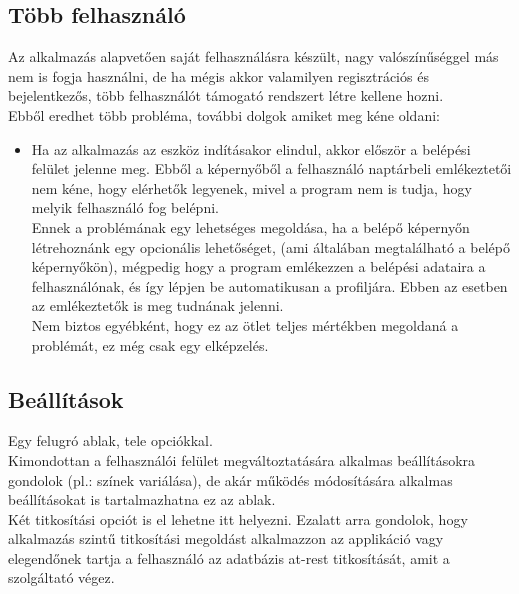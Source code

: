 \subsection{Több felhasználó}
Az alkalmazás alapvetően saját felhasználásra készült, nagy valószínűséggel más nem is fogja használni, de ha mégis akkor valamilyen regisztrációs és bejelentkezős, több felhasználót támogató rendszert létre kellene hozni.
\vspace{5pt}\\Ebből eredhet több probléma, további dolgok amiket meg kéne oldani:
\begin{itemize}
	\item Ha az alkalmazás az eszköz indításakor elindul, akkor először a belépési felület jelenne meg. Ebből a képernyőből a felhasználó naptárbeli emlékeztetői nem kéne, hogy elérhetők legyenek, mivel a program nem is tudja, hogy melyik felhasználó fog belépni.
	\vspace{5pt}\\Ennek a problémának egy lehetséges megoldása, ha a belépő képernyőn létrehoznánk egy opcionális lehetőséget, (ami általában megtalálható a belépő képernyőkön), mégpedig hogy a program emlékezzen a belépési adataira a felhasználónak, és így lépjen be automatikusan a profiljára. Ebben az esetben az emlékeztetők is meg tudnának jelenni. 
	\vspace{5pt}\\Nem biztos egyébként, hogy ez az ötlet teljes mértékben megoldaná a problémát, ez még csak egy elképzelés.
\end{itemize}

\subsection{Beállítások}
Egy felugró ablak, tele opciókkal.
\\Kimondottan a felhasználói felület megváltoztatására alkalmas beállításokra gondolok (pl.: színek variálása), de akár működés	módosítására alkalmas beállításokat is tartalmazhatna ez az ablak.
\\Két titkosítási opciót is el lehetne itt helyezni. Ezalatt arra gondolok, hogy alkalmazás szintű titkosítási megoldást alkalmazzon az applikáció vagy elegendőnek tartja a felhasználó az adatbázis at-rest titkosítását, amit a szolgáltató végez.

